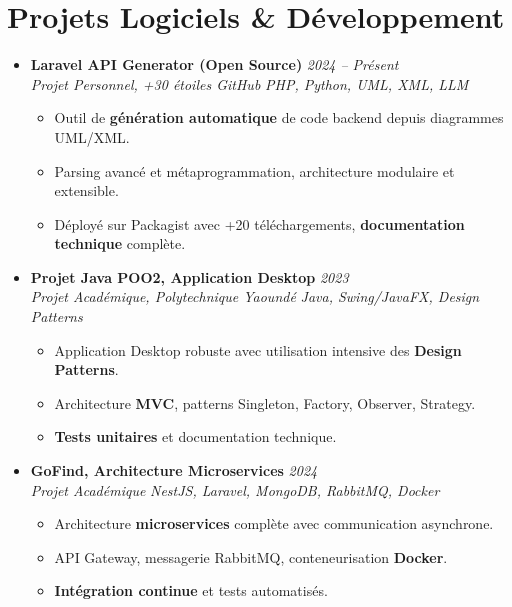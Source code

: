 \documentclass[a4paper,11pt]{article}
\begin{document}
\section{Projets Logiciels \& Développement}
\begin{itemize}[leftmargin=*, label={-}]

\item \textbf{Laravel API Generator (Open Source)} \hfill \textit{2024 -- Présent} \\
\textit{Projet Personnel, +30 étoiles GitHub} \hfill \textit{PHP, Python, UML, XML, LLM}
\vspace{-2pt}
    \begin{itemize}[leftmargin=0.4cm, nosep, label=\tiny$\bullet$]
        \item \small{Outil de \textbf{génération automatique} de code backend depuis diagrammes UML/XML.}
        \item \small{Parsing avancé et métaprogrammation, architecture modulaire et extensible.}
        \item \small{Déployé sur Packagist avec +20 téléchargements, \textbf{documentation technique} complète.}
    \end{itemize}
\vspace{3pt}

\item \textbf{Projet Java POO2, Application Desktop} \hfill \textit{2023} \\
\textit{Projet Académique, Polytechnique Yaoundé} \hfill \textit{Java, Swing/JavaFX, Design Patterns}
\vspace{-2pt}
    \begin{itemize}[leftmargin=0.4cm, nosep, label=\tiny$\bullet$]
        \item \small{Application Desktop robuste avec utilisation intensive des \textbf{Design Patterns}.}
        \item \small{Architecture \textbf{MVC}, patterns Singleton, Factory, Observer, Strategy.}
        \item \small{\textbf{Tests unitaires} et documentation technique.}
    \end{itemize}
\vspace{3pt}

\item \textbf{GoFind, Architecture Microservices} \hfill \textit{2024} \\
\textit{Projet Académique} \hfill \textit{NestJS, Laravel, MongoDB, RabbitMQ, Docker}
\vspace{-2pt}
    \begin{itemize}[leftmargin=0.4cm, nosep, label=\tiny$\bullet$]
        \item \small{Architecture \textbf{microservices} complète avec communication asynchrone.}
        \item \small{API Gateway, messagerie RabbitMQ, conteneurisation \textbf{Docker}.}
        \item \small{\textbf{Intégration continue} et tests automatisés.}
    \end{itemize}
\vspace{3pt}


\end{itemize}
\end{document}
